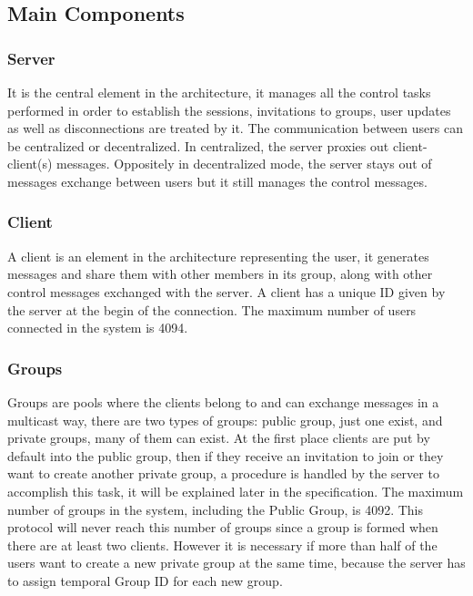 \documentclass{article}
\begin{document}
\subsection{Main Components}

\subsubsection{Server}

It is the central element in the architecture, it manages all the control tasks performed in order to establish the sessions, invitations to groups, user updates as well as disconnections are treated by it. The communication between users can be centralized or decentralized. In centralized, the server proxies out client-client(s) messages. Oppositely in decentralized mode, the server stays out of messages exchange between users but it still manages the control messages.

\subsubsection{Client}

A client is an element in the architecture representing the user, it generates messages and share them with other members in its group, along with other control messages exchanged with the server. A client has a unique ID given by the server at the begin of the connection. The maximum number of users connected in the system is 4094.

\subsubsection{Groups}

Groups are pools where the clients belong to and can exchange messages in a multicast way, there are two types of groups: public group, just one exist, and private groups, many of them can exist. At the first place clients are put by default into the public group, then if they receive an invitation to join or they want to create another private group, a procedure is handled by the server to accomplish this task, it will be explained later in the specification. The maximum number of groups in the system, including the Public Group, is 4092. This protocol will never reach this number of groups since a group is formed when there are at least two clients. However it is necessary if more than half of the users want to create a new private group at the same time, because the server has to assign temporal Group ID for each new group.
\end{document}
